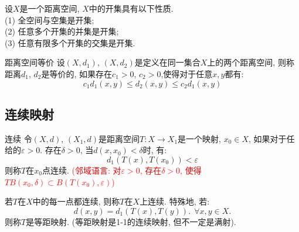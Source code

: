 \documentclass[lang=cn,10pt]{gorgeousnbook}
\numberwithin{equation}{section}%
\numberwithin{figure}{section}%
\begin{document}
\begin{theorem}
设$X$是一个距离空间, $X$中的开集具有以下性质. \\
(1) 全空间与空集是开集;\\
(2) 任意多个开集的并集是开集;\\
(3) 任意有限多个开集的交集是开集.
\end{theorem}

\begin{definition}{距离空间等价}
设$(X,d_1)$, $(X,d_2)$是定义在同一集合$X$上的两个距离空间, 则称距离$d_1$, $d_2$是等价的, 如果存在$c_1>0$, $c_2>0$,使得对于任意$x,y$都有:
\begin{equation}
  c_1d_1(x,y)\leq d_2(x,y)\leq c_2d_1(x,y) \nonumber
\end{equation}
\end{definition}

\subsection{连续映射}
\begin{definition}{连续}
令$(X,d)$, $(X_1,d)$是距离空间$T:X\to X_1$是一个映射, $x_0\in X$, 如果对于任给的$\varepsilon>0$. 存在$\delta>0$, 当$d(x,x_0)<\delta$时, 有:
\begin{equation}
d_1(T(x),T(x_0))<\varepsilon \nonumber
\end{equation}
则称$T$在$x_0$点连续. \textcolor{red}{(邻域语言: 对$\varepsilon>0$, 存在$\delta>0$, 使得$TB(x_0,\delta)\subset B(T(x_0),\varepsilon)$)}\par
若$T$在$X$中的每一点都连续, 则称$T$在$X$上连续. 特殊地, 若:
\begin{equation}
d(x,y)=d_1(T(x),T(y)).\ \  \forall x,y \in X. \nonumber
\end{equation}
则称$T$是等距映射. (等距映射是1-1的连续映射, 但不一定是满射).
\end{definition}
\end{document}
